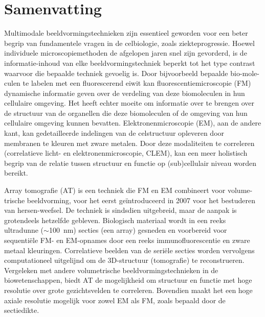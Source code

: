 \chapter*{Samenvatting}

Multimodale beeldvormingstechnieken zijn essentieel geworden voor een beter begrip van fundamentele vragen in de celbiologie, zoals ziekteprogressie. Hoewel individuele microscopiemethoden de afgelopen jaren snel zijn gevorderd, is de informatie-inhoud van elke beeldvormingstechniek beperkt tot het type contrast waarvoor die bepaalde techniek gevoelig is. Door bijvoorbeeld bepaalde bio-mole-culen te labelen met een fluorescerend eiwit kan fluorescentiemicroscopie (FM) dynamische informatie geven over de verdeling van deze biomoleculen in hun cellulaire omgeving. Het heeft echter moeite om informatie over te brengen over de structuur van de organellen die deze biomoleculen of de omgeving van hun cellulaire omgeving kunnen bevatten. Elektronenmicroscopie (EM), aan de andere kant, kan gedetailleerde indelingen van de celstructuur opleveren door membranen te kleuren met zware metalen. Door deze modaliteiten te correleren (correlatieve licht- en elektronenmicroscopie, CLEM), kan een meer holistisch begrip van de relatie tussen structuur en functie op (sub)cellulair niveau worden bereikt.

Array tomografie (AT) is een techniek die FM en EM combineert voor volume-trische beeldvorming, voor het eerst geïntroduceerd in 2007 voor het bestuderen van hersen-weefsel. De techniek is sindsdien uitgebreid, maar de aanpak is grotendeels hetzelfde gebleven. Biologisch materiaal wordt in een reeks ultradunne (${\sim}$\SI{100}{\nano\meter}) secties (een array) gesneden en voorbereid voor sequentiële FM- en EM-opnames door een reeks immunofluorescentie en zware metaal kleuringen. Correlatieve beelden van de seriële secties worden vervolgens computationeel uitgelijnd om de 3D-structuur (tomografie) te reconstrueren. Vergeleken met andere volumetrische beeldvormingstechnieken in de biowetenschappen, biedt AT de mogelijkheid om structuur en functie met hoge resolutie over grote gezichtsvelden te correleren. Bovendien maakt het een hoge axiale resolutie mogelijk voor zowel EM als FM, zoals bepaald door de sectiedikte.

